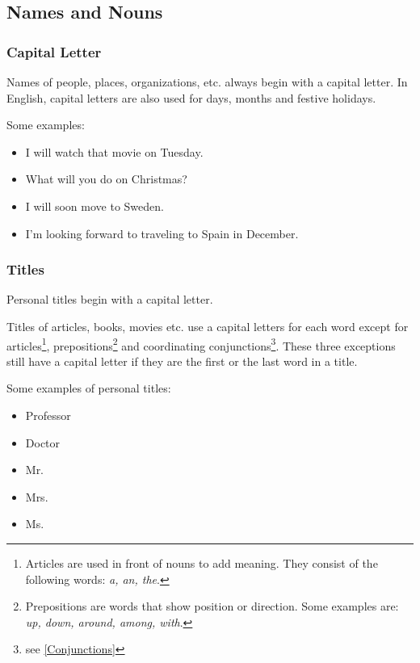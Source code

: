 \subsection{Names and Nouns}

\subsubsection{Capital Letter}
\begin{important}
    Names of people, places, organizations, etc. always begin with a capital letter. In English, capital letters are also used for days, months and festive holidays.
\end{important}

Some examples:
\begin{itemize}
    \item I will watch that movie on Tuesday.
    \item What will you do on Christmas?
    \item I will soon move to Sweden.
    \item I'm looking forward to traveling to Spain in December.
\end{itemize}

\subsubsection{Titles}
\begin{important}[Titles]
    Personal titles begin with a capital letter.
    
    Titles of articles, books, movies etc. use a capital letters for each word except for articles\footnote{Articles are used in front of nouns to add meaning. They consist of the following words: \textit{a, an, the}.}, prepositions\footnote{Prepositions are words that show position or direction. Some examples are: \textit{up, down, around, among, with}.} and coordinating conjunctions\footnote{see \ref{Conjunctions}}. These three exceptions still have a capital letter if they are the first or the last word in a title.
\end{important}

Some examples of personal titles:
\begin{itemize}
    \item Professor
    \item Doctor
    \item Mr.
    \item Mrs.
    \item Ms.
\end{itemize}

